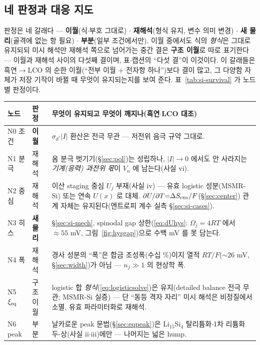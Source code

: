 \subsection{네 판정과 대응 지도}\label{ssec:si-verdicts}
판정은 네 갈래다 --- \textbf{이월}(식$\cdot$부호 그대로) $\cdot$ \textbf{재해석}(형식 유지, 변수 의미
변경) $\cdot$ \textbf{새 물리}(골격에 없는 항 필요) $\cdot$ \textbf{부분}(일부 조건에서만). 이월 중에서도
식의 \emph{형식}은 그대로 유지되되 미시 해석만 재해석 쪽으로 넘어가는 중간 결은 \textbf{구조 이월}로 따로
표기한다 --- 이월과 재해석 사이의 다섯째 결이며, 표$\cdot$캡션의 ``다섯 결''이 이것이다. 이 갈래들은
흑연$\to$LCO 의 순한 이월(``전부 이월 $+$ 전자항 하나'')보다 결이 많고, 그 다양함 자체가 저장 기작이
바뀔 때 무엇이 유지되는지를 보여 준다. 표~\ref{tab:si-survival} 가 노드별 판정이다.

\begin{table}[h]
\centering
\small
\begin{tabular}{p{} p{} p{}}
\toprule
노드 & 판정 & 무엇이 유지되고 무엇이 깨지나(흑연$\cdot$LCO 대조) \\
\midrule
N0 조건 & \textbf{이월} & $\sigma_d$$\cdot$$|I|$ 환산은 전극 무관 --- 저전위 음극 규약 그대로. \\
N1 분극 & 재해석 & 옴 분극 벗기기(\S\ref{sec:pol})는 성립하나, $|I|\!\to\!0$ 에서도 안 사라지는 \emph{기계(응력) 과전위 몫}이 $V_n$ 에 남는다(사실 vi). \\
N2 중심 & 재해석 & 이산 staging 중심 $U_j$ 부재(사실 iv) --- 유효 logistic 성분(MSMR-Si\cite{verbrugge_lisi2016}) 또는 연속 $U(x)$\cite{chevrier_dahn2009} 로 대체. $\partial U/\partial T{=}\Delta S_{\mathrm{rxn}}/F$(\S\ref{sec:center}) 관계 자체는 유지된다(엔트로피 계수 실측 \S\ref{sec:si-cases}). \\
N3 히스 & \textbf{새 물리} & \S\ref{sec:si-mech}. spinodal gap 상한(\eqref{eq:dUhys}: $\Omega_j{=}4RT$ 에서 $\approx55$ mV, 그림~\ref{fig:hysgap})으로 수백 mV 를 못 담는다. \\
N4 폭 & 재해석 & 경사 성분의 ``폭''은 합금 조성폭(수십 \%)이지 열적 $RT/F$($\sim26$ mV, \S\ref{sec:width})가 아님 --- $n_j\!\gg\!1$ 의 현상학 폭. \\
N5 $\xi_{\mathrm{eq}}$ & 구조 이월 & logistic 합 \emph{형식}(\eqref{eq:logisticsolve})은 유지(detailed balance 전극 무관; MSMR-Si 실증) --- 단 ``동등 격자 자리'' 미시 해석은 비정질에서 소멸, 유효 파라미터화로 재해석. \\
N6 peak & 부분 & 날카로운 peak 문법(\S\ref{sec:eqpeak})은 Li$_{15}$Si$_4$ 탈리튬화$\cdot$1차 리튬화 두-상(사실 ii$\cdot$iii)에만 --- 나머지는 넓은 hump. \\

\end{tabular}
\end{table}
